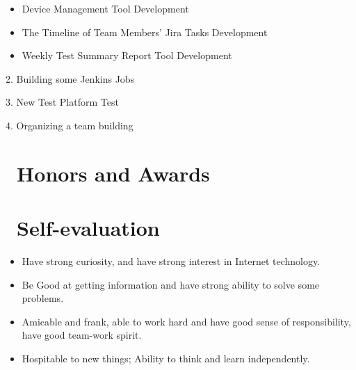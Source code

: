 \documentclass{resume}
\begin{document}
\begin{itemize}
\item Device Management Tool Development
\item The Timeline of Team Members' Jira Tasks Development
\item Weekly Test Summary Report Tool Development
\end{itemize}

2. Building some Jenkins Jobs

3. New Test Platform Test

4. Organizing a team building






\section{\faHeartO\ Honors and Awards}
\begin{itemize}

\end{itemize}
\section{\faInfo\ Self-evaluation}
\begin{itemize}[parsep=1ex]
  \item Have strong curiosity, and have strong interest in Internet technology.
  \item Be Good at getting information and have strong ability to solve some problems.
  \item Amicable and frank, able to work hard and have good sense of responsibility, have good team-work spirit.
  \item Hospitable to new things; Ability to think and learn independently.
\end{itemize}

%
%
\end{document}
